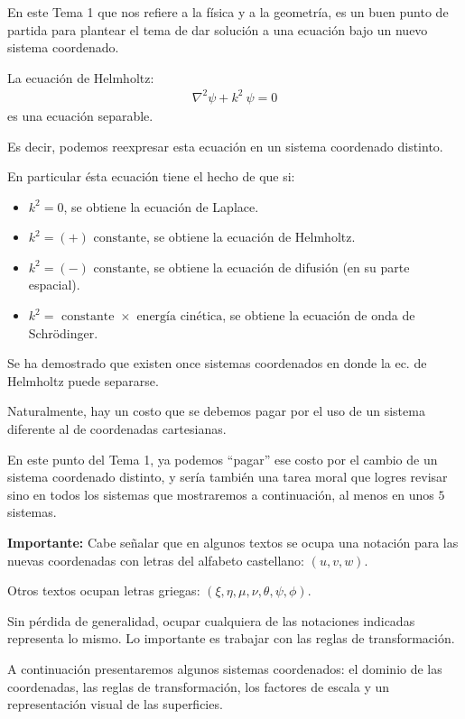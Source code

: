 En este Tema 1 que nos refiere a la física y a la geometría, es un buen punto de partida para plantear el tema de dar solución a una ecuación bajo un nuevo sistema coordenado.
\par
La ecuación de Helmholtz:
\begin{align}
\nabla^{2} \psi + k^{2} \: \psi = 0
\label{eq:ecuacion_02_01}
\end{align}
es una ecuación separable.
\par
Es decir, podemos reexpresar esta ecuación en un sistema coordenado distinto.
\par
En particular ésta ecuación tiene el hecho de que si:
\begin{itemize}
\item $k^{2} = 0$, se obtiene la ecuación de Laplace.
\item $k^{2} = (+) \mbox{ constante}$, se obtiene la ecuación de Helmholtz.
\item $k^{2} = (-) \mbox{ constante}$, se obtiene la ecuación de difusión (en su parte espacial).
\item $k^{2} = \mbox{ constante } \times \mbox{ energía cinética}$, se obtiene la ecuación de onda de Schrödinger.
\end{itemize}

Se ha demostrado que existen once sistemas coordenados en donde la ec. de Helmholtz puede separarse. 
\par
Naturalmente, hay un costo que se debemos pagar por el uso de un sistema diferente al de coordenadas cartesianas.
\par
En este punto del Tema 1, ya podemos \enquote{pagar} ese costo por el cambio de un sistema coordenado distinto, y sería también una tarea moral que logres revisar sino en todos los sistemas que mostraremos a continuación, al menos en unos $5$ sistemas.
\par
\textbf{Importante: } Cabe señalar que en algunos textos se ocupa una notación para las nuevas coordenadas con letras del alfabeto castellano: $(u,v,w)$.
\par
Otros textos ocupan letras griegas: $(\xi, \eta, \mu, \nu, \theta, \psi, \phi)$.
\par
Sin pérdida de generalidad, ocupar cualquiera de las notaciones indicadas representa lo mismo. Lo importante es trabajar con las reglas de transformación.
\par
A continuación presentaremos algunos sistemas coordenados: el dominio de las coordenadas, las reglas de transformación, los factores de escala y un representación visual de las superficies.

